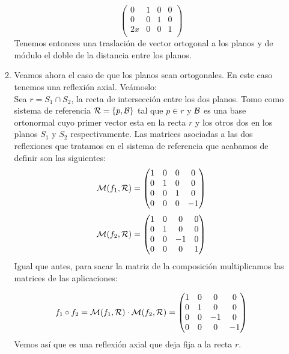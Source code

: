 \documentclass[12pt]{article}
\begin{document}
\begin{ejercicio}[3 puntos]
\begin{enumerate}
\begin{enumerate}
$$\begin{pmatrix}
                    0 & 1 & 0 & 0 \\
                    0 & 0 & 1 & 0 \\
                    2x & 0 & 0 & 1\\
                \end{pmatrix} $$   
                Tenemos entonces una traslación de vector ortogonal a los planos y de módulo el doble de la distancia entre los planos.
            \item Veamos ahora el caso de que los planos sean ortogonales. En este caso tenemos una reflexión axial. Veámoslo:\\
                Sea $r=S_1\cap S_2$, la recta de intersección entre los dos planos. Tomo como sistema de referencia $\mathcal{R}=\{p,\mathcal{B}\}$ tal que $p\in r$ y $\mathcal{B}$ es una base ortonormal cuyo primer vector esta en la recta $r$ y los otros dos en los planos $S_1$ y $S_2$ respectivamente. 
                Las matrices asociadas a las dos reflexiones que tratamos en el sistema de referencia que acabamos de definir son las siguientes:
                $$\mathcal{M}(f_1,\mathcal{R})=
                \begin{pmatrix}
                    1 & 0 & 0 & 0 \\
                    0 & 1 & 0 & 0 \\
                    0 & 0 & 1 & 0 \\
                    0 & 0 & 0 & -1 \\
                \end{pmatrix}$$    
                $$\mathcal{M}(f_2,\mathcal{R})=
                \begin{pmatrix}
                    1 & 0 & 0 & 0 \\
                    0 & 1 & 0 & 0 \\
                    0 & 0 & -1 & 0 \\
                    0 & 0 & 0 & 1 \\
                \end{pmatrix}$$    
                Igual que antes, para sacar la matriz de la composición multiplicamos las matrices de las aplicaciones:

                $$f_1\circ f_2=\mathcal{M}(f_1,\mathcal{R})\cdot \mathcal{M}(f_2,\mathcal{R}) = 
                \begin{pmatrix}
                    1 & 0 & 0 & 0 \\
                    0 & 1 & 0 & 0 \\
                    0 & 0 & -1 & 0 \\
                    0 & 0 & 0 & -1\\
                \end{pmatrix} $$   
                Vemos así que es una reflexión axial que deja fija a la recta $r$.
            

\end{enumerate}
\end{enumerate}
\end{ejercicio}
\end{document}
